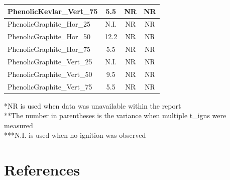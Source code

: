 \documentclass{abstract}
\begin{document}
\begin{table}[htbp]
\begin{tabularx}{\textwidth}{|L|c|c|c|}
		PhenolicKevlar\_Vert\_75 & 5.5 & NR & NR \\
		\hline
		PhenolicGraphite\_Hor\_25 & N.I. & NR & NR \\
		\hline
		PhenolicGraphite\_Hor\_50 & 12.2 & NR & NR \\
		\hline
		PhenolicGraphite\_Hor\_75 & 5.5 & NR & NR \\
		\hline
		PhenolicGraphite\_Vert\_25 & N.I. & NR & NR \\
		\hline
		PhenolicGraphite\_Vert\_50 & 9.5 & NR & NR \\
		\hline
		PhenolicGraphite\_Vert\_75 & 5.5 & NR & NR \\
		\hline
	\end{tabularx}
\end{table}
 
 *NR is used when data was unavailable within the report \\
 **The number in parentheses is the variance when multiple t\_igns were measured \\
 ***N.I. is used when no ignition was observed \\
 




\section{References}
\printbibliography[heading=none]
\end{document}
